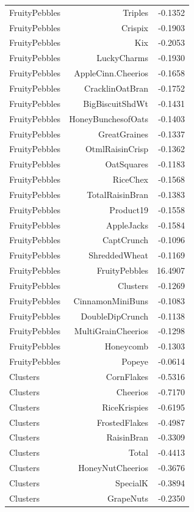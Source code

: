 \begin{longtable}{@{}lrr@{}}
FruityPebbles & Triples & -0.1352 \\
FruityPebbles & Crispix & -0.1903 \\
FruityPebbles & Kix & -0.2053 \\
FruityPebbles & LuckyCharms & -0.1930 \\
FruityPebbles & AppleCinn.Cheerios & -0.1658 \\
FruityPebbles & CracklinOatBran & -0.1752 \\
FruityPebbles & BigBiscuitShdWt & -0.1431 \\
FruityPebbles & HoneyBunchesofOats & -0.1403 \\
FruityPebbles & GreatGraines & -0.1337 \\
FruityPebbles & OtmlRaisinCrisp & -0.1362 \\
FruityPebbles & OatSquares & -0.1183 \\
FruityPebbles & RiceChex & -0.1568 \\
FruityPebbles & TotalRaisinBran & -0.1383 \\
FruityPebbles & Product19 & -0.1558 \\
FruityPebbles & AppleJacks & -0.1584 \\
FruityPebbles & CaptCrunch & -0.1096 \\
FruityPebbles & ShreddedWheat & -0.1169 \\
FruityPebbles & FruityPebbles & 16.4907 \\
FruityPebbles & Clusters & -0.1269 \\
FruityPebbles & CinnamonMiniBuns & -0.1083 \\
FruityPebbles & DoubleDipCrunch & -0.1138 \\
FruityPebbles & MultiGrainCheerios & -0.1298 \\
FruityPebbles & Honeycomb & -0.1303 \\
FruityPebbles & Popeye & -0.0614 \\
Clusters & CornFlakes & -0.5316 \\
Clusters & Cheerios & -0.7170 \\
Clusters & RiceKrispies & -0.6195 \\
Clusters & FrostedFlakes & -0.4987 \\
Clusters & RaisinBran & -0.3309 \\
Clusters & Total & -0.4413 \\
Clusters & HoneyNutCheerios & -0.3676 \\
Clusters & SpecialK & -0.3894 \\
Clusters & GrapeNuts & -0.2350 \\

\end{longtable}
